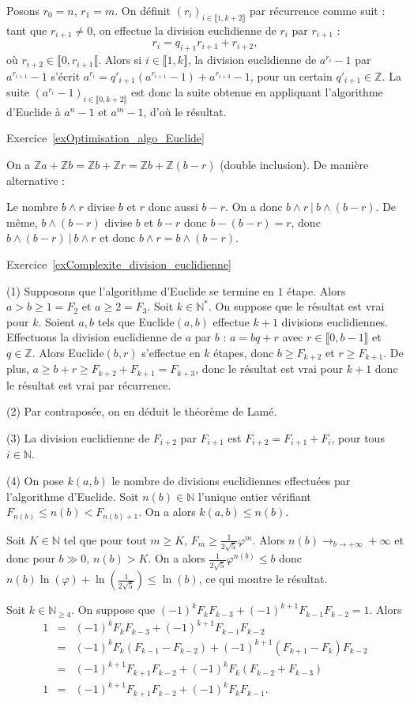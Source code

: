 \documentclass[11pt,a4paper]{article}
\newcommand{\N}{\mathbb{N}}
\newcommand{\Z}{\mathbb{Z}}
\begin{document}
Posons $r_0=n$, $r_1=m$. On définit $(r_i)_{i\in \llbracket 1,k+2\rrbracket}$ par récurrence comme suit : tant que $r_{i+1}\neq 0$, on effectue la division euclidienne de $r_{i}$ par $r_{i+1}$ : \[r_i=q_{i+1} r_{i+1}+ r_{i+2},\] où $r_{i+2}\in \llbracket 0, r_{i+1}\llbracket$. Alors si $i\in \llbracket 1,k\rrbracket$, la division euclidienne de $a^{r_i}-1$ par $a^{r_{i+1}}-1$ s'écrit $a^{r_i}=q'_{i+1} (a^{r_{i+1}}-1)+a^{r_{i+2}}-1$, pour un certain $q'_{i+1}\in \Z$. La suite $(a^{r_i}-1)_{i\in \llbracket 0,k+2\rrbracket}$ est donc la suite obtenue en appliquant l'algorithme d'Euclide à $a^{n}-1$ et $a^m-1$, d'où le résultat.

Exercice~\ref{exOptimisation_algo_Euclide}

On a $\Z a+\Z b =\Z b+\Z r=\Z b+ \Z (b-r)$ (double inclusion). De manière alternative :

Le nombre $b\wedge r$ divise $b$ et $r$ donc aussi $b-r$. On a donc $b\wedge r\  |\  b\wedge (b-r)$. De même, $b\wedge (b-r)$ divise $b$ et $b-r$ donc $b-(b-r)=r$, donc $b\wedge (b-r)\ |\  b\wedge r$ et donc  $b\wedge r=b\wedge (b-r)$.


Exercice~\ref{exComplexite_division_euclidienne}

(1) Supposons que l'algorithme d'Euclide se termine en $1$ étape. Alors $a>b\geq 1=F_2$ et $a\geq 2=F_{3}$. Soit $k\in \N^*$. On suppose que le résultat est vrai pour $k$. Soient $a,b$ tels que Euclide$(a,b)$ effectue $k+1$ divisions euclidiennes. Effectuons la division euclidienne de $a$ par $b$ : $a=bq+r$ avec $r\in \llbracket 0,b-1\rrbracket$ et $q\in \Z$. Alors Euclide$(b,r)$ s'effectue en $k$ étapes, donc $b\geq F_{k+2}$ et $r\geq F_{k+1}$. De plus, $a\geq b+r\geq F_{k+2}+F_{k+1}=F_{k+3}$, donc le résultat est vrai pour $k+1$ donc le résultat est vrai par récurrence.

(2) Par contraposée, on en déduit le théorème de Lamé.

(3) La division euclidienne de $F_{i+2}$ par $F_{i+1}$ est $F_{i+2}=F_{i+1}+F_i$, pour tous $i\in \N$. 

(4) On pose $k(a,b)$ le nombre de divisions euclidiennes effectuées par l'algorithme d'Euclide. Soit $n(b)\in \N$ l'unique entier vérifiant $F_{n(b)}\leq n(b)<F_{n(b)+1}$. On a alors $k(a,b)\leq n(b)$. 

Soit $K\in \N$ tel que pour tout $m\geq K$, $F_m\geq \frac{1}{2\sqrt{5}}\varphi^{m}$. Alors $n(b)\rightarrow_{b\rightarrow +\infty} +\infty$ et donc pour $b\gg 0$, $n(b) >K$. On a alors $\frac{1}{2\sqrt{5}} \varphi^{n(b)}\leq b$ donc $n(b)\ln(\varphi)+\ln(\frac{1}{2\sqrt{5}})\leq \ln(b)$, ce qui montre le résultat.

Soit $k\in \N_{\geq 4}$. On suppose que $(-1)^k F_k F_{k-3} +(-1)^{k+1} F_{k-1} F_{k-2}=1$. Alors \[\begin{aligned} 1 &=& (-1)^k F_k F_{k-3} +(-1)^{k+1} F_{k-1} F_{k-2} \\
&=& (-1)^k F_k (F_{k-1}-F_{k-2})+(-1)^{k+1} (F_{k+1}-F_k) F_{k-2}\\
&=& (-1)^{k+1} F_{k+1} F_{k-2}+(-1)^k F_k(F_{k-2}+F_{k-3})\\
1 &=& (-1)^{k+1} F_{k+1} F_{k-2} + (-1)^k F_kF_{k-1}.\end{aligned}\]
\end{document}
